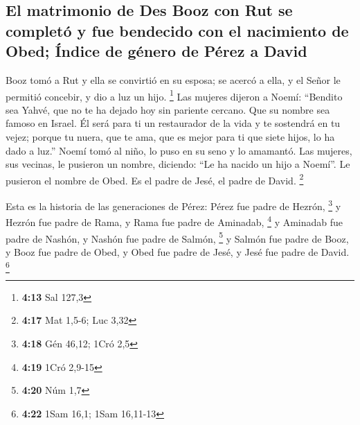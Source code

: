 \hypertarget{el-matrimonio-de-des-booz-con-rut-se-completuxf3-y-fue-bendecido-con-el-nacimiento-de-obed-uxedndice-de-guxe9nero-de-puxe9rez-a-david}{%
\subsection{El matrimonio de Des Booz con Rut se completó y fue
bendecido con el nacimiento de Obed; Índice de género de Pérez a
David}\label{el-matrimonio-de-des-booz-con-rut-se-completuxf3-y-fue-bendecido-con-el-nacimiento-de-obed-uxedndice-de-guxe9nero-de-puxe9rez-a-david}}

 Booz tomó a Rut y ella se convirtió en su esposa; se
acercó a ella, y el Señor le permitió concebir, y dio a luz un hijo.
\footnote{\textbf{4:13} Sal 127,3}  Las mujeres dijeron a
Noemí: ``Bendito sea Yahvé, que no te ha dejado hoy sin pariente
cercano. Que su nombre sea famoso en Israel.  Él será
para ti un restaurador de la vida y te sostendrá en tu vejez; porque tu
nuera, que te ama, que es mejor para ti que siete hijos, lo ha dado a
luz.''  Noemí tomó al niño, lo puso en su seno y lo
amamantó.  Las mujeres, sus vecinas, le pusieron un
nombre, diciendo: ``Le ha nacido un hijo a Noemí''. Le pusieron el
nombre de Obed. Es el padre de Jesé, el padre de David. \footnote{\textbf{4:17}
  Mat 1,5-6; Luc 3,32}

 Esta es la historia de las generaciones de Pérez: Pérez
fue padre de Hezrón, \footnote{\textbf{4:18} Gén 46,12; 1Cró 2,5}
 y Hezrón fue padre de Rama, y Rama fue padre de
Aminadab, \footnote{\textbf{4:19} 1Cró 2,9-15}  y
Aminadab fue padre de Nashón, y Nashón fue padre de Salmón, \footnote{\textbf{4:20}
  Núm 1,7}  y Salmón fue padre de Booz, y Booz fue padre
de Obed,  y Obed fue padre de Jesé, y Jesé fue padre de
David. \footnote{\textbf{4:22} 1Sam 16,1; 1Sam 16,11-13}
